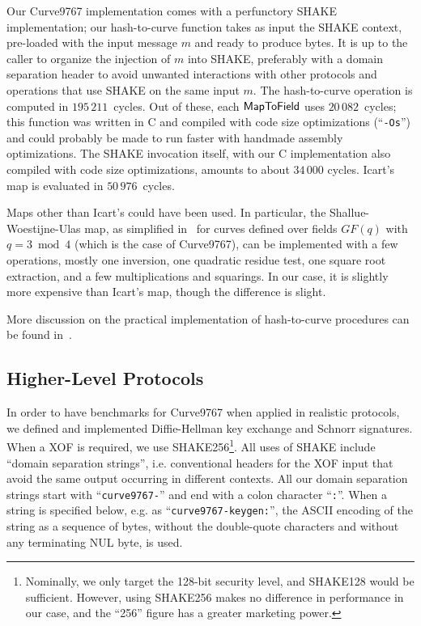 \documentclass{llncs}
\newcommand{\GF}{GF}
\begin{document}
Our Curve9767 implementation comes with a perfunctory SHAKE
implementation; our hash-to-curve function takes as input the SHAKE
context, pre-loaded with the input message $m$ and ready to produce
bytes. It is up to the caller to organize the injection of $m$ into
SHAKE, preferably with a domain separation header to avoid unwanted
interactions with other protocols and operations that use SHAKE on
the same input $m$. The hash-to-curve operation is computed in
$195\,211$~cycles. Out of these, each $\text{\textsf{MapToField}}$
uses $20\,082$~cycles; this function was written in C and compiled with
code size optimizations (``\verb+-Os+'') and could probably be made to
run faster with handmade assembly optimizations. The SHAKE invocation itself,
with our C implementation also compiled with code size optimizations,
amounts to about $34\,000$ cycles. Icart's map is evaluated in
$50\,976$~cycles.

Maps other than Icart's could have been used. In particular, the
Shallue-Woestijne-Ulas map\cite{ShaWoe2006,Ula2007}, as simplified
in~\cite{BriCorIcaMadRanTib2010} for curves defined over fields $\GF(q)$
with $q = 3 \bmod 4$ (which is the case of Curve9767), can be
implemented with a few operations, mostly one inversion, one quadratic
residue test, one square root extraction, and a few multiplications and
squarings. In our case, it is slightly more expensive than Icart's map,
though the difference is slight.

More discussion on the practical implementation of hash-to-curve
procedures can be found in~\cite{DraftHashToCurve05}.

\subsection{Higher-Level Protocols}\label{sec:curve9767:highlevel}

In order to have benchmarks for Curve9767 when applied in realistic
protocols, we defined and implemented Diffie-Hellman key exchange and
Schnorr signatures. When a XOF is required, we use
SHAKE256\footnote{Nominally, we only target the 128-bit security level,
and SHAKE128 would be sufficient. However, using SHAKE256 makes no
difference in performance in our case, and the ``256'' figure has a
greater marketing power.}. All uses of SHAKE include ``domain separation
strings'', i.e. conventional headers for the XOF input that avoid the
same output occurring in different contexts. All our domain separation
strings start with ``\verb+curve9767-+'' and end with a colon character
``\verb+:+''. When a string is specified below, e.g. as
``\verb+curve9767-keygen:+'', the ASCII encoding of the string as a
sequence of bytes, without the double-quote characters and without any
terminating NUL byte, is used.
\end{document}
